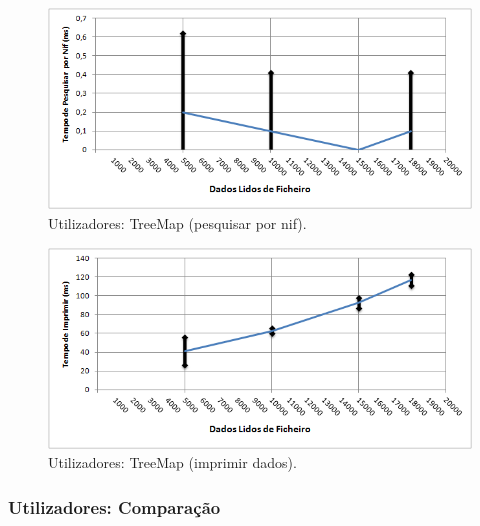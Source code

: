 \documentclass[a5paper,twocolumn, 11pt]{article}
\begin{document}
\begin{figure}[h!b!t!]
    \caption[Utilizadores: TreeMap (pesquisar por nif)]{Utilizadores: TreeMap (pesquisar por nif).}
    \label{hashtable}
    \centering
        \includegraphics[width=400pt]{user_c4_o4.png}
\end{figure}
\begin{figure}[h!b!t!]
    \caption[Utilizadores: TreeMap (imprimir dados)]{Utilizadores: TreeMap (imprimir dados).}
    \label{hashtable}
    \centering
        \includegraphics[width=400pt]{user_c4_o5.png}
\end{figure}




\newpage
\twocolumn
\newpage

\subsubsection[Utilizadores:\\Comparação]{Utilizadores: Comparação}
\end{document}
